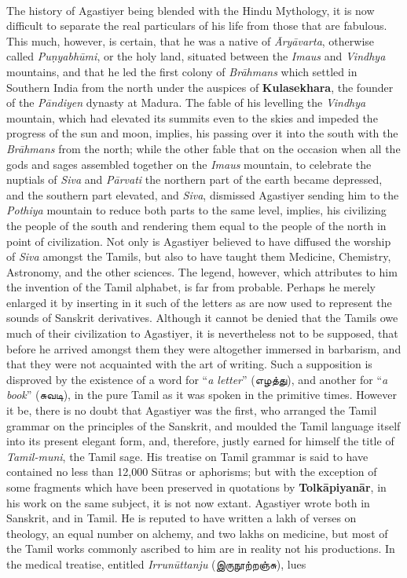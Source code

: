 \documentclass{article}
\newcommand{\TamilText}[1]{\texttamil{#1}}
\newcommand{\tam}[1]{\TamilText{#1}}
\begin{document}
\paragraph{}
The history of Agastiyer being blended with the Hindu Mythology, it is now difficult to separate the real particulars of his life from those that are fabulous. This much, however, is certain, that he was a native of \emph{\={A}ry\={a}varta}, otherwise called \emph{Puṇyabh\={u}mi}, or the holy land, situated between the \emph{Imaus} and \emph{Vindhya} mountains, and that he led the first colony of \emph{Br\={a}hmans} which settled in Southern India from the north under the auspices of \textbf{Kulasekhara}, the founder of the \emph{P\={a}ndiyen} dynasty at Madura. The fable of his levelling the \emph{Vindhya} mountain, which had elevated its summits even to the skies and impeded the progress of the sun and moon, implies, his passing over it into the south with the \emph{Br\={a}hmans} from the north; while the other fable that on the occasion when all the gods and sages assembled together on the \emph{Imaus} mountain, to celebrate the nuptials of \emph{Siva} and \emph{P\={a}rvati} the northern part of the earth became depressed, and the southern part elevated, and \emph{Siva}, dismissed Agastiyer sending him to the \emph{Pothiya} mountain to reduce both parts to the same level, implies, his civilizing the people of the south and rendering them equal to the people of the north in point of civilization. Not only is Agastiyer believed to have diffused the worship of \emph{Siva} amongst the Tamils, but also to have taught them Medicine, Chemistry, Astronomy, and the other sciences. The legend, however, which attributes to him the invention of the Tamil alphabet, is far from probable. Perhaps he merely enlarged it by inserting in it such of the letters as are now used to represent the sounds of Sanskrit derivatives. Although it cannot be denied that the Tamils owe much of their civilization to Agastiyer, it is nevertheless not to be supposed, that before he arrived amongst them they were altogether immersed in barbarism, and that they were not acquainted with the art of writing. Such a supposition is disproved by the existence of a word for ``\emph{a letter}'' (\tam{எழத்து}), and another for ``\emph{a book}'' (\tam{சுவடி}), in the pure Tamil as it was spoken in the primitive times. However it be, there is no doubt that Agastiyer was the first, who arranged the Tamil grammar on the principles of the Sanskrit, and moulded the Tamil language itself into its present elegant form, and, therefore, justly earned for himself the title of \emph{Tamil-muni}, the Tamil sage. His treatise on Tamil grammar is said to have contained no less than 12,000 S\={u}tras or aphorisms; but with the exception of some fragments which have been preserved in quotations by \textbf{Tolk\={a}piyan\={a}r}, in his work on the same subject, it is not now extant. Agastiyer wrote both in Sanskrit, and in Tamil. He is reputed to have written a lakh of verses on theology, an equal number on alchemy, and two lakhs on medicine, but most of the Tamil works commonly ascribed to him are in reality not his productions. In the medical treatise, entitled \emph{Irrun\={u}ttanju} (\tam{இருநூற்றஞ்சு}), lues 
\end{document}

